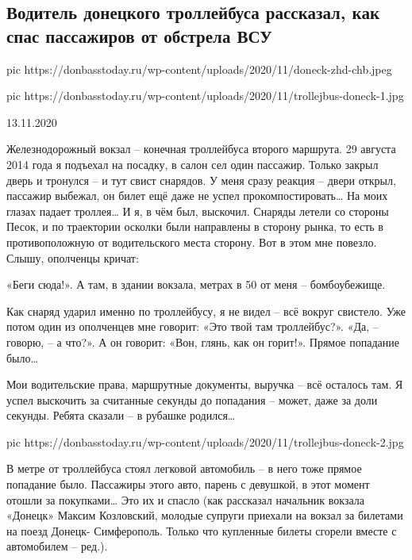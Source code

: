  
 
 

\subsection{Водитель донецкого троллейбуса рассказал, как спас пассажиров от обстрела ВСУ}

\ifcmt
pic https://donbasstoday.ru/wp-content/uploads/2020/11/doneck-zhd-chb.jpeg

pic https://donbasstoday.ru/wp-content/uploads/2020/11/trollejbus-doneck-1.jpg
\fi

13.11.2020

Железнодорожный вокзал – конечная троллейбуса второго маршрута. 29 августа
2014 года я подъехал на посадку, в салон сел один пассажир. Только закрыл
дверь и тронулся – и тут свист снарядов. У меня сразу реакция – двери
открыл, пассажир выбежал, он билет ещё даже не успел прокомпостировать… На
моих глазах падает троллея… И я, в чём был, выскочил. Снаряды летели со
стороны Песок, и по траектории осколки были направлены в сторону рынка, то
есть в противоположную от водительского места сторону. Вот в этом мне
повезло. Слышу, ополченцы кричат:

«Беги сюда!». А там, в здании вокзала, метрах в 50 от меня – бомбоубежище.

Как снаряд ударил именно по троллейбусу, я не видел – всё вокруг свистело.
Уже потом один из ополченцев мне говорит: «Это твой там троллейбус?». «Да,
– говорю, – а что?». А он говорит: «Вон, глянь, как он горит!». Прямое
попадание было…

Мои водительские права, маршрутные документы, выручка – всё осталось там.
Я успел выскочить за считанные секунды до попадания – может, даже за доли
секунды. Ребята сказали – в рубашке родился…

\ifcmt
pic https://donbasstoday.ru/wp-content/uploads/2020/11/trollejbus-doneck-2.jpg
\fi

В метре от троллейбуса стоял легковой автомобиль – в него тоже прямое
попадание было. Пассажиры этого авто, парень с девушкой, в этот момент
отошли за покупками… Это их и спасло (как рассказал начальник вокзала
«Донецк» Максим Козловский, молодые супруги приехали на вокзал за билетами
на поезд Донецк- Симферополь. Только что купленные билеты сгорели вместе с
автомобилем – ред.).

